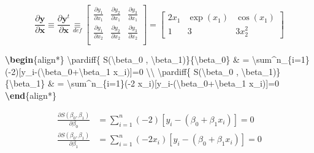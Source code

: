 \documentclass[
]{book}
\newenvironment{Shaded}{\begin{snugshade}}{\end{snugshade}}
\newcommand{\ExtensionTok}[1]{#1}
\newcommand{\KeywordTok}[1]{\textcolor[rgb]{0.13,0.29,0.53}{\textbf{#1}}}
\newcommand{\NormalTok}[1]{#1}
\newcommand{\SpecialCharTok}[1]{\textcolor[rgb]{0.00,0.00,0.00}{#1}}
\newcommand{\SpecialStringTok}[1]{\textcolor[rgb]{0.31,0.60,0.02}{#1}}
\newcommand{\pardiff}[2]{\frac{\partial #1}{\partial #2 }}
\theoremstyle{definition}
\theoremstyle{definition}
\theoremstyle{definition}
\theoremstyle{definition}
\theoremstyle{remark}
\begin{document}
\begin{equation*}
\pardiff{ \bm y}{\bm x}  \equiv \pardiff{ \bm y^t}{\bm x}
\underset{def}{\equiv} \begin{bmatrix}
\pardiff{  y_1}{ x_1} &  \pardiff{  y_2}{ x_1} &  \pardiff{  y_3}{ x_1}  \\
\pardiff{  y_1}{ x_2} &  \pardiff{  y_2}{ x_2} &  \pardiff{  y_3}{ x_2}  \\
\end{bmatrix}
=  \begin{bmatrix}
2x_1 &  \exp(x_1) & \cos(x_1)  \\
1 &  3  &  3x_2^2
\end{bmatrix}
\end{equation*}

\begin{Shaded}
\begin{Highlighting}[]
\KeywordTok{\textbackslash{}begin}\NormalTok{\{}\ExtensionTok{align*}\NormalTok{\}}
\SpecialStringTok{ }\SpecialCharTok{\textbackslash{}pardiff}\SpecialStringTok{\{ S(}\SpecialCharTok{\textbackslash{}beta}\SpecialStringTok{\_0 , }\SpecialCharTok{\textbackslash{}beta}\SpecialStringTok{\_1)\}\{}\SpecialCharTok{\textbackslash{}beta}\SpecialStringTok{\_0\} \& = }\SpecialCharTok{\textbackslash{}sum}\SpecialStringTok{\^{}n\_\{i=1\}({-}2)[y\_i{-}(}\SpecialCharTok{\textbackslash{}beta}\SpecialStringTok{\_0+}\SpecialCharTok{\textbackslash{}beta}\SpecialStringTok{\_1 x\_i)]=0   }\SpecialCharTok{\textbackslash{}\textbackslash{}}\SpecialStringTok{ }
\SpecialCharTok{\textbackslash{}pardiff}\SpecialStringTok{\{ S(}\SpecialCharTok{\textbackslash{}beta}\SpecialStringTok{\_0 , }\SpecialCharTok{\textbackslash{}beta}\SpecialStringTok{\_1)\}\{}\SpecialCharTok{\textbackslash{}beta}\SpecialStringTok{\_1\}  \& = }\SpecialCharTok{\textbackslash{}sum}\SpecialStringTok{\^{}n\_\{i=1\}({-}2 x\_i)[y\_i{-}(}\SpecialCharTok{\textbackslash{}beta}\SpecialStringTok{\_0+}\SpecialCharTok{\textbackslash{}beta}\SpecialStringTok{\_1 x\_i)]=0 }
\KeywordTok{\textbackslash{}end}\NormalTok{\{}\ExtensionTok{align*}\NormalTok{\}}
\end{Highlighting}
\end{Shaded}

\begin{align*}
 \pardiff{ S(\beta_0 , \beta_1)}{\beta_0} & = \sum^n_{i=1}(-2)[y_i-(\beta_0+\beta_1 x_i)]=0   \\ 
\pardiff{ S(\beta_0 , \beta_1)}{\beta_1}  & = \sum^n_{i=1}(-2 x_i)[y_i-(\beta_0+\beta_1 x_i)]=0 
\end{align*}
\end{document}

